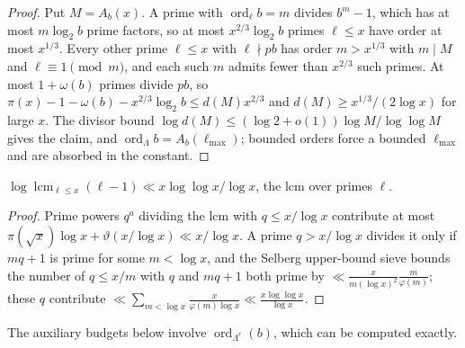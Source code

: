 \documentclass[11pt]{article}
\DeclareMathOperator{\ord}{ord}
\DeclareMathOperator{\lcm}{lcm}
\begin{document}
\begin{proof}
Put $M=A_b(x)$. A prime with $\ord_\ell b=m$ divides $b^m-1$, which has at most $m\log_2b$ prime factors, so at most
$x^{2/3}\log_2b$ primes $\ell\le x$ have order at most $x^{1/3}$. Every other prime $\ell\le x$ with $\ell\nmid pb$ has order
$m>x^{1/3}$ with $m\mid M$ and $\ell\equiv1\pmod m$, and each such $m$ admits fewer than $x^{2/3}$ such primes. At most
$1+\omega(b)$ primes divide $pb$, so $\pi(x)-1-\omega(b)-x^{2/3}\log_2b\le d(M)x^{2/3}$ and $d(M)\ge x^{1/3}/(2\log x)$ for large
$x$. The divisor bound $\log d(M)\le(\log2+o(1))\log M/\log\log M$ \cite[Theorem~317]{HW08} gives the claim, and
$\ord_\Lambda b=A_b(\ell_{\max})$; bounded orders force a bounded $\ell_{\max}$ and are absorbed in the constant.
\end{proof}

\begin{lemma}\label{lem:Ax}
$\log\lcm_{\ell\le x}(\ell-1)\ll x\log\log x/\log x$, the lcm over primes $\ell$.
\end{lemma}

\begin{proof}
Prime powers $q^a$ dividing the lcm with $q\le x/\log x$ contribute at most $\pi(\sqrt x)\log x+\vartheta(x/\log x)\ll x/\log x$.
A prime $q>x/\log x$ divides it only if $mq+1$ is prime for some $m<\log x$, and the Selberg upper-bound sieve
\cite{HR74} bounds the number of $q\le x/m$ with $q$ and $mq+1$ both prime by $\ll\frac{x}{m(\log x)^2}\frac m{\varphi(m)}$; these
$q$ contribute $\ll\sum_{m<\log x}\frac{x}{\varphi(m)\log x}\ll\frac{x\log\log x}{\log x}$.
\end{proof}

The auxiliary budgets below involve $\ord_{\Lambda^r}(b)$, which can be computed exactly.
\end{document}
